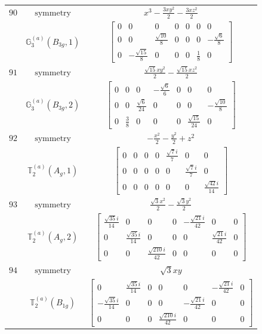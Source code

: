 \documentclass[fleqn,8pt,landscape]{jsarticle}
\begin{document}
\begin{longtable}{ccc}
$ 90 $ & $ \text{symmetry} $ & $ x^{3} - \frac{3 x y^{2}}{2} - \frac{3 x z^{2}}{2} $ \\
$  $ & $ \mathbb{G}_{3}^{(a)}(B_{3g},1) $ & $ \begin{bmatrix} 0 & 0 & 0 & 0 & 0 & 0 & 0 \\ 0 & 0 & \frac{\sqrt{10}}{8} & 0 & 0 & 0 & - \frac{\sqrt{6}}{8} \\ 0 & - \frac{\sqrt{15}}{8} & 0 & 0 & 0 & \frac{1}{8} & 0 \end{bmatrix} $ \\ \hline
$ 91 $ & $ \text{symmetry} $ & $ \frac{\sqrt{15} x y^{2}}{2} - \frac{\sqrt{15} x z^{2}}{2} $ \\
$  $ & $ \mathbb{G}_{3}^{(a)}(B_{3g},2) $ & $ \begin{bmatrix} 0 & 0 & 0 & - \frac{\sqrt{6}}{6} & 0 & 0 & 0 \\ 0 & 0 & \frac{\sqrt{6}}{24} & 0 & 0 & 0 & - \frac{\sqrt{10}}{8} \\ 0 & \frac{3}{8} & 0 & 0 & 0 & \frac{\sqrt{15}}{24} & 0 \end{bmatrix} $ \\ \hline
$ 92 $ & $ \text{symmetry} $ & $ - \frac{x^{2}}{2} - \frac{y^{2}}{2} + z^{2} $ \\
$  $ & $ \mathbb{T}_{2}^{(a)}(A_{g},1) $ & $ \begin{bmatrix} 0 & 0 & 0 & 0 & \frac{\sqrt{7} i}{7} & 0 & 0 \\ 0 & 0 & 0 & 0 & 0 & \frac{\sqrt{7} i}{7} & 0 \\ 0 & 0 & 0 & 0 & 0 & 0 & \frac{\sqrt{42} i}{14} \end{bmatrix} $ \\ \hline
$ 93 $ & $ \text{symmetry} $ & $ \frac{\sqrt{3} x^{2}}{2} - \frac{\sqrt{3} y^{2}}{2} $ \\
$  $ & $ \mathbb{T}_{2}^{(a)}(A_{g},2) $ & $ \begin{bmatrix} \frac{\sqrt{35} i}{14} & 0 & 0 & 0 & - \frac{\sqrt{21} i}{42} & 0 & 0 \\ 0 & \frac{\sqrt{35} i}{14} & 0 & 0 & 0 & \frac{\sqrt{21} i}{42} & 0 \\ 0 & 0 & \frac{\sqrt{210} i}{42} & 0 & 0 & 0 & 0 \end{bmatrix} $ \\ \hline
$ 94 $ & $ \text{symmetry} $ & $ \sqrt{3} x y $ \\
$  $ & $ \mathbb{T}_{2}^{(a)}(B_{1g}) $ & $ \begin{bmatrix} 0 & \frac{\sqrt{35} i}{14} & 0 & 0 & 0 & - \frac{\sqrt{21} i}{42} & 0 \\ - \frac{\sqrt{35} i}{14} & 0 & 0 & 0 & - \frac{\sqrt{21} i}{42} & 0 & 0 \\ 0 & 0 & 0 & \frac{\sqrt{210} i}{42} & 0 & 0 & 0 \end{bmatrix} $ \\ \hline

\end{longtable}
\end{document}
